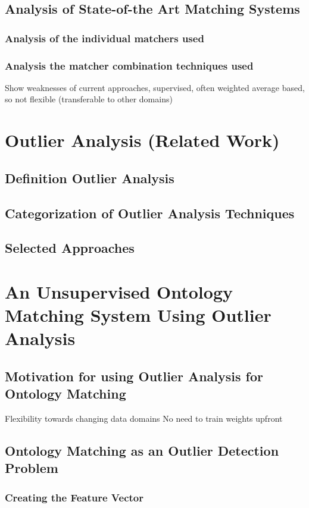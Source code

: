 \documentclass[11pt,titlepage,oneside,openany,a4paper]{report}
\begin{document}
\clearpage

\section{Analysis of State-of-the Art Matching Systems}
\subsection{Analysis of the individual matchers used}
\subsection{Analysis the matcher combination techniques used}
Show weaknesses of current approaches, supervised, often weighted average based, so not flexible (transferable to other domains)

\chapter{Outlier Analysis (Related Work)}
\section{Definition Outlier Analysis}
\section{Categorization of Outlier Analysis Techniques}
\section{Selected Approaches}


\chapter{An Unsupervised Ontology Matching System Using Outlier Analysis}
\section{Motivation for using Outlier Analysis for Ontology Matching}
Flexibility towards changing data domains
No need to train weights upfront
\section{Ontology Matching as an Outlier Detection Problem}
\subsection{Creating the Feature Vector}
\end{document}
